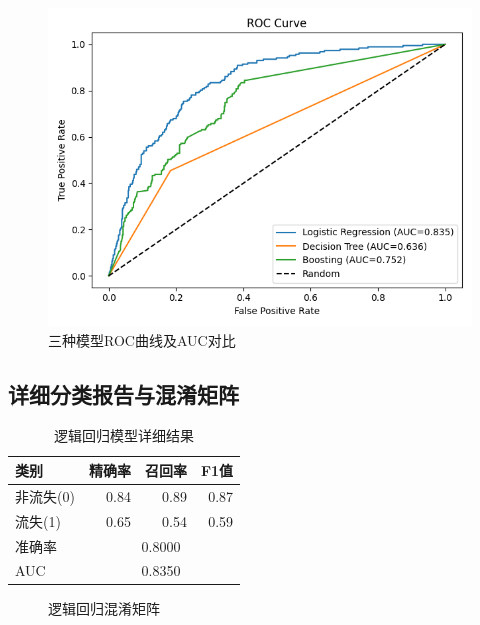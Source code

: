 \documentclass{article}
\begin{document}
\begin{figure}[t]
\centering
\includegraphics[width=0.9\columnwidth]{fig/roc_curve.png}
\caption{三种模型ROC曲线及AUC对比}
\label{fig:roc}
\end{figure}

\subsection{详细分类报告与混淆矩阵}

\begin{table}[t]
\caption{逻辑回归模型详细结果}
\label{tab:logistic-regression}
\begin{center}
\scriptsize  %
\begin{tabular}{@{}lrrr@{}}
\toprule
\textbf{类别} & \textbf{精确率} & \textbf{召回率} & \textbf{F1值} \\
\midrule
非流失(0) & 0.84 & 0.89 & 0.87 \\
流失(1) & 0.65 & 0.54 & 0.59 \\
\midrule
准确率 & \multicolumn{3}{c}{0.8000} \\
AUC & \multicolumn{3}{c}{0.8350} \\
\bottomrule
\end{tabular}
\end{center}
\end{table}

\begin{figure}[t]
\centering
\small
\setlength{\fboxsep}{3pt}
\caption{逻辑回归混淆矩阵}
\label{fig:confusion-lr}
\end{figure}
\end{document}

